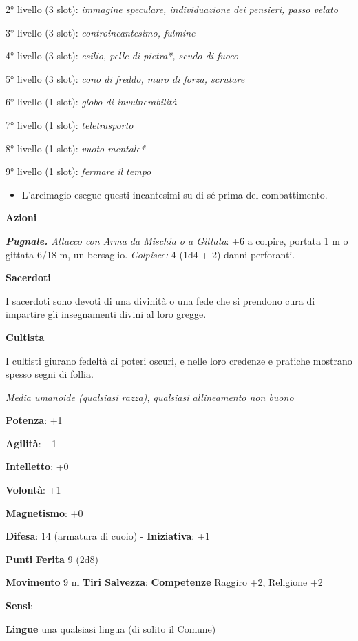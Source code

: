 \begin{multicols}{2}
2° livello (3 slot): \emph{immagine speculare, individuazione dei}
\emph{pensieri, passo velato}

3° livello (3 slot): \emph{controincantesimo, fulmine}

4° livello (3 slot): \emph{esilio, pelle di pietra*, scudo di fuoco}

5° livello (3 slot): \emph{cono di freddo, muro di forza, scrutare}

6° livello (1 slot): \emph{globo di invulnerabilità}

7° livello (1 slot): \emph{teletrasporto}

8° livello (1 slot): \emph{vuoto mentale*}

9° livello (1 slot): \emph{fermare il tempo}


\begin{itemize}
\item
  L'arcimagio esegue questi incantesimi su di sé prima del
  combattimento.
\end{itemize}


\smallskip\textbf{Azioni}

\emph{\textbf{Pugnale.} Attacco con Arma da Mischia o a Gittata}: +6 a
colpire, portata 1 m o gittata 6/18 m, un bersaglio. \emph{Colpisce:}
4 (1d4 + 2) danni perforanti.


\textbf{Sacerdoti}

I sacerdoti sono devoti di una divinità o una fede che si prendono cura
di impartire gli insegnamenti divini al loro gregge.

\textbf{Cultista}

I cultisti giurano fedeltà ai poteri oscuri, e nelle loro credenze e
pratiche mostrano spesso segni di follia.

\emph{Media umanoide (qualsiasi razza), qualsiasi allineamento non
buono}

\textbf{Potenza}: +1

\textbf{Agilità}: +1

\textbf{Intelletto}: +0

\textbf{Volontà}: +1

\textbf{Magnetismo}: +0

\textbf{Difesa}: 14 (armatura di cuoio) - \textbf{Iniziativa}: +1

\textbf{Punti Ferita} 9 (2d8)

\textbf{Movimento} 9 m
\textbf{Tiri Salvezza}:
\textbf{Competenze} Raggiro +2, Religione +2

\textbf{Sensi}: 

\textbf{Lingue} una qualsiasi lingua (di solito il Comune)


\end{multicols}
